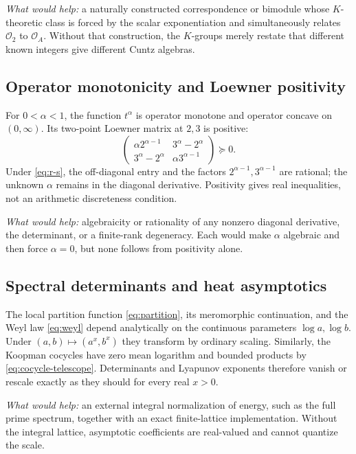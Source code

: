 \documentclass[11pt,oneside]{article}
\theoremstyle{definition}
\theoremstyle{remark}
\begin{document}
\emph{What would help:} a naturally constructed correspondence or
bimodule whose \(K\)-theoretic class is forced by the scalar
exponentiation and simultaneously relates \(\mathcal O_2\) to
\(\mathcal O_A\).  Without that construction, the \(K\)-groups merely
restate that different known integers give different Cuntz algebras.

\subsection{Operator monotonicity and Loewner positivity}

For \(0<\alpha<1\), the function \(t^\alpha\) is operator monotone and
operator concave on \((0,\infty)\).  Its two-point Loewner matrix at
\(2,3\) is positive:
\[
 \begin{pmatrix}
   \alpha2^{\alpha-1}&3^\alpha-2^\alpha\\
   3^\alpha-2^\alpha&\alpha3^{\alpha-1}
 \end{pmatrix}\succeq0.
\]
Under \eqref{eq:r-s}, the off-diagonal entry and the factors
\(2^{\alpha-1},3^{\alpha-1}\) are rational; the unknown \(\alpha\)
remains in the diagonal derivative.  Positivity gives real inequalities,
not an arithmetic discreteness condition.

\emph{What would help:} algebraicity or rationality of any nonzero
diagonal derivative, the determinant, or a finite-rank degeneracy.
Each would make \(\alpha\) algebraic and then force \(\alpha=0\), but
none follows from positivity alone.

\subsection{Spectral determinants and heat asymptotics}

The local partition function \eqref{eq:partition}, its meromorphic
continuation, and the Weyl law \eqref{eq:weyl} depend analytically on
the continuous parameters \(\log a,\log b\).  Under
\((a,b)\mapsto(a^x,b^x)\) they transform by ordinary scaling.
Similarly, the Koopman cocycles have zero mean logarithm and bounded
products by \eqref{eq:cocycle-telescope}.  Determinants and Lyapunov
exponents therefore vanish or rescale exactly as they should for every
real \(x>0\).

\emph{What would help:} an external integral normalization of energy,
such as the full prime spectrum, together with an exact finite-lattice
implementation.  Without the integral lattice, asymptotic coefficients
are real-valued and cannot quantize the scale.
\end{document}
